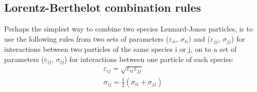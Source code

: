 \subsection{Lorentz-Berthelot combination rules}
Perhaps the simplest way to combine two species Lennard-Jones particles, is to use the following rules from two sets of parameters ($\varepsilon_{ii}$, $\sigma_{ii}$) and ($\varepsilon_{jj}$, $\sigma_{jj}$) for interactions between two particles of the same species i or j, on to a set of parameters ($\varepsilon_{ij}$, $\sigma_{ij}$) for interactions between one particle of each species:
\begin{align}
\varepsilon_{ij} = \sqrt{\varepsilon_{ii}\varepsilon_{jj}} \\
\sigma_{ij} = \frac{1}{2} \left(\sigma_{ii}+\sigma_{jj}\right)
\end{align}


